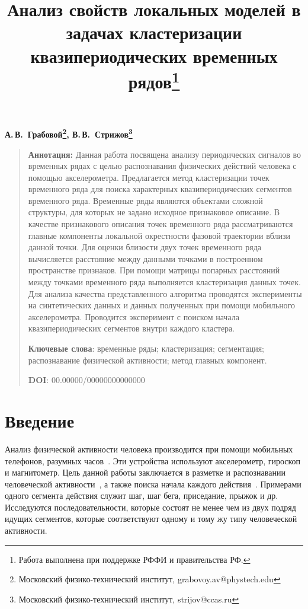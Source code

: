\documentclass[12pt, twoside]{article}
\numberwithin{equation}{section}
\begin{document}
\title{\bf Анализ свойств локальных моделей в задачах кластеризации квазипериодических временных рядов\thanks{Работа выполнена при поддержке РФФИ и правительства РФ.}}
\date{}
\author{}
\maketitle

\begin{center}
\bf
А.\,В.~Грабовой\footnote{Московский физико-технический институт, grabovoy.av@phystech.edu}, В.\,В.~Стрижов\footnote{Московский физико-технический институт, strijov@ccas.ru}

\end{center}

{\centering\begin{quote}
\textbf{Аннотация:} Данная работа посвящена анализу периодических сигналов во временных рядах с целью распознавания физических действий человека с помощью акселерометра. 
Предлагается метод кластеризации точек временного ряда для поиска характерных квазипериодических сегментов временного ряда. 
Временные ряды являются объектами сложной структуры, для которых не задано исходное признаковое описание. 
В качестве признакового описания точек временного ряда рассматриваются главные компоненты локальной окрестности фазовой траектории вблизи данной точки. 
Для оценки близости двух точек временного ряда вычисляется расстояние между данными точками в построенном пространстве признаков. 
При помощи матрицы попарных расстояний между точками временного ряда выполняется кластеризация данных точек. 
Для анализа качества представленного алгоритма проводятся эксперименты на синтетических данных и данных полученных при помощи мобильного акселерометра. 
Проводится эксперимент с поиском начала квазипериодических сегментов внутри каждого кластера.


\smallskip
\textbf{Ключевые слова}: временные ряды; кластеризация; сегментация; распознавание физической активности; метод главных компонент.

\smallskip
\textbf{DOI}: 00.00000/00000000000000
\end{quote}
}

\section{Введение}
Анализ физической активности человека производится при помощи мобильных телефонов, разумных часов~\cite{kwapisz2010, wang2014}. 
Эти устройства используют акселерометр, гироскоп и магнитометр. 
Цель данной работы заключается в  разметке и распознавании человеческой активности~\cite{Ignatov2015, Olivares2012, cinar2018}, а также поиска начала каждого действия~\cite{motrenko2015}. 
Примерами одного сегмента действия служит шаг, шаг бега, приседание, прыжок и др. 
Исследуются последовательности, которые состоят не менее чем из двух подряд идущих сегментов, которые соответствуют одному и тому жу типу человеческой активности.
\end{document}
